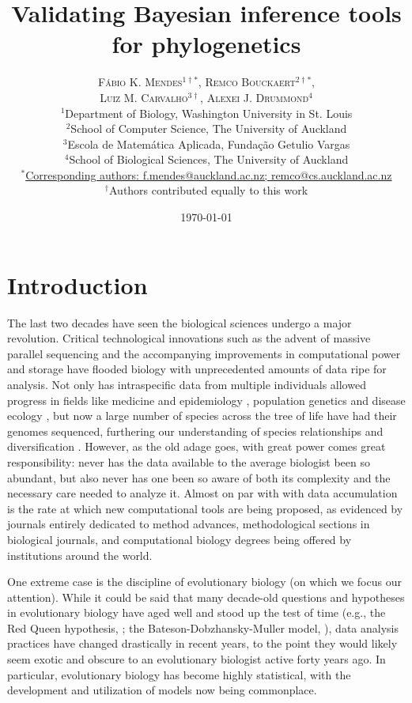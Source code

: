\documentclass[oneside]{article}
\title{Validating Bayesian inference tools for phylogenetics} %
\author{\textsc{F\'{a}bio K. Mendes$^{1\dagger*}$}, \textsc{Remco Bouckaert$^{2\dagger*}$},\\
\textsc{Luiz M. Carvalho$^{3\dagger}$}, \textsc{Alexei J. Drummond$^{4}$} \\
\small $^1$Department of Biology, Washington University in St. Louis\\
\small $^2$School of Computer Science, The University of Auckland\\
\small $^3$Escola de Matem\'{a}tica Aplicada, Fundaç\~{a}o Getulio Vargas\\
\small $^4$School of Biological Sciences, The University of Auckland\\
\small
\href{mailto:f.mendes@auckland.ac.nz}{$^*$Corresponding authors:
  f.mendes@auckland.ac.nz; remco@cs.auckland.ac.nz}\\
{\small $^\dagger$Authors contributed equally to this work}
}
\date{\today} %
\begin{document}
\maketitle


\section*{Introduction}
The last two decades have seen the biological sciences undergo a major revolution.
Critical technological innovations such as the advent of massive
parallel sequencing and the accompanying improvements in computational
power and storage have flooded biology with unprecedented amounts of
data ripe for analysis.
Not only has intraspecific data from multiple individuals allowed
progress in fields like medicine and epidemiology
\citep[e.g.,][]{1000g,humanmicrobiome,neafsey15}, population genetics
\citep[e.g.,][]{lynch07,lack16,demanuel16} and disease ecology
\citep[e.g.,][]{rosenblum13,bates18}, but now a large number of species
across the tree of life have had their genomes sequenced, furthering
our understanding of species relationships and diversification
\citep[e.g.,][]{martin13,brawand14,jarvis14,novikova16,pease2016,kawahara19,upham19}.
However, as the old adage goes, with great power comes great
responsibility: never has the data available to the average biologist
been so abundant, but also never has one been so aware of both its
complexity and the necessary care needed to analyze it.
Almost on par with with data accumulation is the rate at which new
computational tools are being proposed, as evidenced by journals
entirely dedicated to method advances, methodological sections in
biological journals, and computational biology degrees being offered
by institutions around the world.

One extreme case is the discipline of evolutionary biology (on which
we focus our attention).
While it could be said that many decade-old questions and hypotheses
in evolutionary biology have aged well and stood up the test of time
(e.g., the Red Queen hypothesis,
\citealt{vanvalen73,lively87,morran11,gibson15}; the
Bateson-Dobzhansky-Muller model,
\citealt{dob36,muller40,hopkins12,roda17}), data analysis practices
have changed drastically in recent years, to the point they would
likely seem exotic and obscure to an evolutionary biologist active
forty years ago.
In particular, evolutionary biology has become highly statistical,
with the development and utilization of models now being commonplace.
\end{document}
